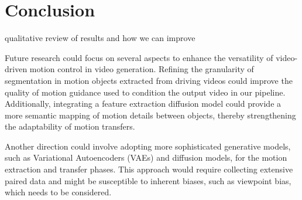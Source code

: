 \section{Conclusion}

qualitative review of results and how we can improve

Future research could focus on several aspects to enhance the versatility of video-driven motion control in video generation. Refining the granularity of segmentation in motion objects extracted from driving videos could improve the quality of motion guidance used to condition the output video in our pipeline. Additionally, integrating a feature extraction diffusion model \cite{luo2024diffusion} could provide a more semantic mapping of motion details between objects, thereby strengthening the adaptability of motion transfers.

Another direction could involve adopting more sophisticated generative models, such as Variational Autoencoders (VAEs) and diffusion models, for the motion extraction and transfer phases. This approach would require collecting extensive paired data and might be susceptible to inherent biases, such as viewpoint bias, which needs to be considered.
